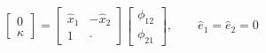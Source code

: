 \begin{equation}\label{eq:sys-Stigum1994}
\left[\begin{array}{c}
	  0    \\
	\kappa
\end{array}\right]
=
\left[\begin{array}{cc}
	\hat{x}_1 & -\hat{x}_2 \\
	    1     &   \cdot
\end{array}\right]
\left[\begin{array}{c}
	\phi_{12} \\
	\phi_{21}
\end{array}\right]
,\qquad
\hat{e}_1 = \hat{e}_2 = 0
\end{equation}